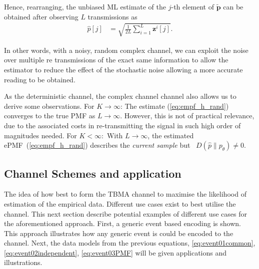 \documentclass{article}
\begin{document}
Hence, rearranging, the unbiased ML estimate of the $j$-th element of $\tilde{\boldsymbol{p}}$ can be obtained after observing $L$ transmissions as
%
\begin{align}
    \hat{p}[j] &= \sqrt{\frac{1}{2L} \sum_{i = 1}^{L}\boldsymbol{z}^i[j]}.\label{eq:empf_h_rand}
\end{align}

In other words, with a noisy, random complex channel, we can exploit the noise over multiple re transmissions of the exact same information to allow the estimator to reduce the effect of the stochastic noise allowing a more accurate reading to be obtained. 

As the deterministic channel, the complex channel channel also allows us to derive some observations. For $K \rightarrow \infty$: The estimate (\ref{eq:empf_h_rand}) converges to the true PMF as $L \rightarrow \infty$. However, this is not of practical relevance, due to the associated costs in re-transmitting the signal in such high order of magnitudes needed. For $K <\infty:$ With $L \rightarrow \infty$, the estimated ePMF~(\ref{eq:empf_h_rand}) describes the \emph{current sample} but ~$D(\hat{p}\| p_{\theta}) \neq 0$. 

\subsection{Channel Schemes and application} \label{schemas_and_channels}
The idea of how best to form the TBMA channel to maximise the likelihood of estimation of the empirical data. Different use cases exist to best utilise the channel. This next section describe potential examples of different use cases for the aforementioned approach. First, a generic event based encoding is shown. This approach illustrates how any generic event is could be encoded to the channel. Next, the data models from the previous equations, \ref{eq:event01common},\ref{eq:event02independent}, \ref{eq:event03PMF} will be given applications and illustrations.  
\end{document}
